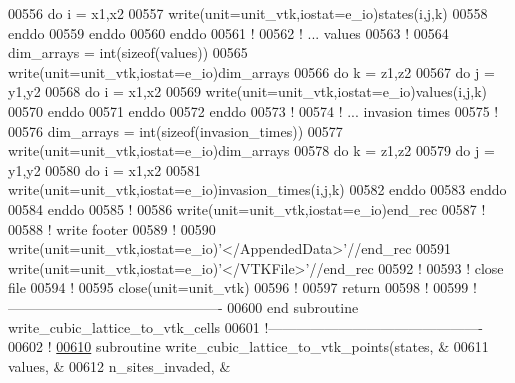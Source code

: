 \begin{DoxyCode}
00556       \textcolor{keyword}{do} i = x1,x2
00557          \textcolor{keyword}{write}(unit=unit\_vtk,iostat=e\_io)states(i,j,k)
00558       \textcolor{keyword}{enddo}
00559    \textcolor{keyword}{enddo}
00560 \textcolor{keyword}{enddo}
00561 \textcolor{comment}{!}
00562 \textcolor{comment}{! ... values}
00563 \textcolor{comment}{!}
00564 dim\_arrays = int(sizeof(values))
00565 \textcolor{keyword}{write}(unit=unit\_vtk,iostat=e\_io)dim\_arrays
00566 \textcolor{keyword}{do} k = z1,z2
00567    \textcolor{keyword}{do} j = y1,y2
00568       \textcolor{keyword}{do} i = x1,x2
00569          \textcolor{keyword}{write}(unit=unit\_vtk,iostat=e\_io)values(i,j,k)
00570       \textcolor{keyword}{enddo}
00571    \textcolor{keyword}{enddo}
00572 \textcolor{keyword}{enddo}
00573 \textcolor{comment}{!}
00574 \textcolor{comment}{! ... invasion times}
00575 \textcolor{comment}{!}
00576 dim\_arrays = int(sizeof(invasion\_times))
00577 \textcolor{keyword}{write}(unit=unit\_vtk,iostat=e\_io)dim\_arrays
00578 \textcolor{keyword}{do} k = z1,z2
00579    \textcolor{keyword}{do} j = y1,y2
00580       \textcolor{keyword}{do} i = x1,x2
00581          \textcolor{keyword}{write}(unit=unit\_vtk,iostat=e\_io)invasion\_times(i,j,k)
00582       \textcolor{keyword}{enddo}
00583    \textcolor{keyword}{enddo}
00584 \textcolor{keyword}{enddo}
00585 \textcolor{comment}{!}
00586 \textcolor{keyword}{write}(unit=unit\_vtk,iostat=e\_io)end\_rec
00587 \textcolor{comment}{!}
00588 \textcolor{comment}{! write footer}
00589 \textcolor{comment}{!}
00590 \textcolor{keyword}{write}(unit=unit\_vtk,iostat=e\_io)\textcolor{stringliteral}{'</AppendedData>'}//end\_rec
00591 \textcolor{keyword}{write}(unit=unit\_vtk,iostat=e\_io)\textcolor{stringliteral}{'</VTKFile>'}//end\_rec
00592 \textcolor{comment}{!}
00593 \textcolor{comment}{! close file}
00594 \textcolor{comment}{!}
00595 \textcolor{keyword}{close}(unit=unit\_vtk)
00596 \textcolor{comment}{!}
00597 return
00598 \textcolor{comment}{!}
00599 \textcolor{comment}{!----------------------------------------------}
00600 \textcolor{keyword}{end subroutine write\_cubic\_lattice\_to\_vtk\_cells}
00601 \textcolor{comment}{!----------------------------------------------}
00602 \textcolor{comment}{!}
\hypertarget{module__write__output__files_8f90_source_l00610}{}\hyperlink{classmodule__write__output__files_a552d5ba3b776310f45eabf5f2df4f9c2}{00610} \textcolor{keyword}{subroutine }write\_cubic\_lattice\_to\_vtk\_points(states,          &
00611                                              values,          &
00612                                              n\_sites\_invaded, &

\end{DoxyCode}
